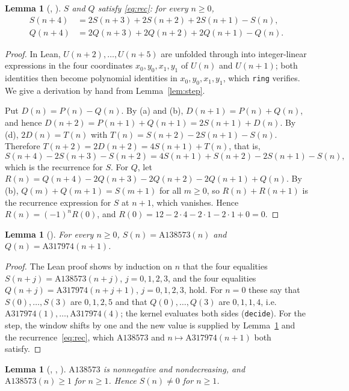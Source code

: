 \documentclass[11pt]{amsart}
\theoremstyle{plain}
\newtheorem{lemma}[theorem]{Lemma}
\theoremstyle{definition}
\newcommand{\seq}[1]{\mathrm{A#1}}
\begin{document}
\begin{lemma}[, ]\label{lem:rec}
$S$ and $Q$ satisfy \eqref{eq:rec}: for every $n\ge0$,
\begin{align*}
S(n+4)&=2S(n+3)+2S(n+2)+2S(n+1)-S(n),\\
Q(n+4)&=2Q(n+3)+2Q(n+2)+2Q(n+1)-Q(n).
\end{align*}
\end{lemma}

\begin{proof}
In Lean, $U(n+2),\dots,U(n+5)$ are unfolded through  into integer-linear expressions in the four coordinates $x_0,y_0,x_1,y_1$ of $U(n)$ and $U(n+1)$; both identities then become polynomial identities in $x_0,y_0,x_1,y_1$, which \texttt{ring} verifies. We give a derivation by hand from Lemma~\ref{lem:step}.

Put $D(n)=P(n)-Q(n)$. By (a) and (b), $D(n+1)=P(n)+Q(n)$, and hence
$D(n+2)=P(n+1)+Q(n+1)=2S(n+1)+D(n)$. By (d), $2D(n)=T(n)$ with $T(n)=S(n+2)-2S(n+1)-S(n)$. Therefore $T(n+2)=2D(n+2)=4S(n+1)+T(n)$, that is,
\[
S(n+4)-2S(n+3)-S(n+2)=4S(n+1)+S(n+2)-2S(n+1)-S(n),
\]
which is the recurrence for $S$. For $Q$, let $R(n)=Q(n+4)-2Q(n+3)-2Q(n+2)-2Q(n+1)+Q(n)$. By (b), $Q(m)+Q(m+1)=S(m+1)$ for all $m\ge0$, so $R(n)+R(n+1)$ is the recurrence expression for $S$ at $n+1$, which vanishes. Hence $R(n)=(-1)^nR(0)$, and $R(0)=12-2\cdot4-2\cdot1-2\cdot1+0=0$.
\end{proof}

\begin{lemma}[]\label{lem:ident}
For every $n\ge0$, $S(n)=\seq{138573}(n)$ and $Q(n)=\seq{317974}(n+1)$.
\end{lemma}

\begin{proof}
The Lean proof shows by induction on $n$ that the four equalities $S(n+j)=\seq{138573}(n+j)$, $j=0,1,2,3$, and the four equalities $Q(n+j)=\seq{317974}(n+j+1)$, $j=0,1,2,3$, hold. For $n=0$ these say that $S(0),\dots,S(3)$ are $0,1,2,5$ and that $Q(0),\dots,Q(3)$ are $0,1,1,4$, i.e.\ $\seq{317974}(1),\dots,\seq{317974}(4)$; the kernel evaluates both sides (\texttt{decide}). For the step, the window shifts by one and the new value is supplied by Lemma~\ref{lem:rec} and the recurrence~\eqref{eq:rec}, which $\seq{138573}$ and $n\mapsto\seq{317974}(n+1)$ both satisfy.
\end{proof}

\begin{lemma}[, , ]\label{lem:pos}
$\seq{138573}$ is nonnegative and nondecreasing, and $\seq{138573}(n)\ge1$ for $n\ge1$. Hence $S(n)\ne0$ for $n\ge1$.
\end{lemma}
\end{document}

